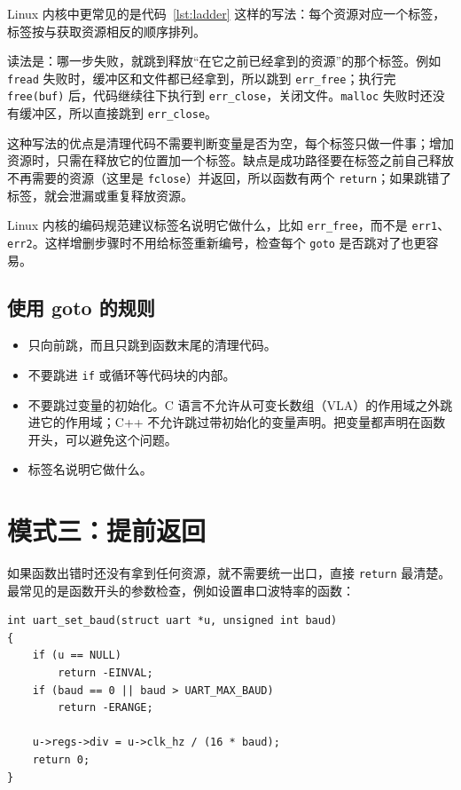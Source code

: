 Linux 内核中更常见的是代码~\ref{lst:ladder} 这样的写法：每个资源对应一个标签，标签按与获取资源相反的顺序排列。


读法是：哪一步失败，就跳到释放“在它之前已经拿到的资源”的那个标签。例如 \texttt{fread} 失败时，缓冲区和文件都已经拿到，所以跳到 \texttt{err\_free}；执行完 \texttt{free(buf)} 后，代码继续往下执行到 \texttt{err\_close}，关闭文件。\texttt{malloc} 失败时还没有缓冲区，所以直接跳到 \texttt{err\_close}。

这种写法的优点是清理代码不需要判断变量是否为空，每个标签只做一件事；增加资源时，只需在释放它的位置加一个标签。缺点是成功路径要在标签之前自己释放不再需要的资源（这里是 \texttt{fclose}）并返回，所以函数有两个 \texttt{return}；如果跳错了标签，就会泄漏或重复释放资源。

Linux 内核的编码规范建议标签名说明它做什么，比如 \texttt{err\_free}，而不是 \texttt{err1}、\texttt{err2}\cite{linux-coding-style}。这样增删步骤时不用给标签重新编号，检查每个 \texttt{goto} 是否跳对了也更容易。

\subsection{使用 goto 的规则}

\begin{itemize}
  \item 只向前跳，而且只跳到函数末尾的清理代码。
  \item 不要跳进 \texttt{if} 或循环等代码块的内部。
  \item 不要跳过变量的初始化。C 语言不允许从可变长数组（VLA）的作用域之外跳进它的作用域；C++ 不允许跳过带初始化的变量声明。把变量都声明在函数开头，可以避免这个问题。
  \item 标签名说明它做什么。
\end{itemize}

\section{模式三：提前返回}
\label{sec:early-return}

如果函数出错时还没有拿到任何资源，就不需要统一出口，直接 \texttt{return} 最清楚。最常见的是函数开头的参数检查，例如设置串口波特率的函数：
\begin{verbatim}
int uart_set_baud(struct uart *u, unsigned int baud)
{
    if (u == NULL)
        return -EINVAL;
    if (baud == 0 || baud > UART_MAX_BAUD)
        return -ERANGE;

    u->regs->div = u->clk_hz / (16 * baud);
    return 0;
}
\end{verbatim}

